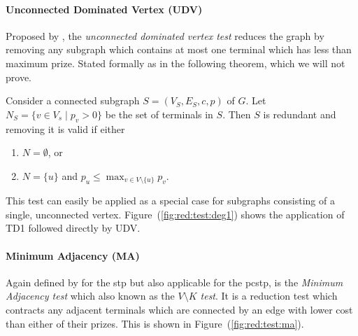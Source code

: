 \paragraph{Unconnected Dominated Vertex (UDV)}\label{sec:pre:udv}
Proposed by \citet{rehfeldt2016reduction},
the \textit{unconnected dominated vertex test} reduces the
graph by removing any subgraph which contains at most one terminal which has less than maximum prize.
Stated formally as in the following theorem, which we will not prove.
\begin{theorem}
  Consider a connected subgraph $S = (V_S, E_S, c, p)$ of $G$. Let $N_S = \{v \in V_s \mid p_v > 0\}$
  be the set of terminals in $S$. Then $S$ is redundant and removing it is valid if either
  \begin{enumerate}
  \item $N = \emptyset$, or
  \item $N = \{u\}$ and $p_u \leq \max_{v \in V \setminus \{u\}} p_v$.
  \end{enumerate}
\end{theorem}

This test can easily be applied as a special case for subgraphs consisting of a single,
 unconnected vertex.
 Figure~(\ref{fig:red:test:deg1}) shows the application
 of TD1 followed directly by UDV.\@
\paragraph{Minimum Adjacency (MA)}
Again defined by \citet{duin1989reduction} for the \gls{stp}
but also applicable for the \gls{pcstp}, is
the \textit{Minimum Adjacency test}
which also known as the \textit{$V \setminus K$ test}.
It is a reduction test which contracts any adjacent
terminals which are connected by an edge with lower cost than either of their prizes.
 This is shown in Figure~(\ref{fig:red:test:ma}).
 
